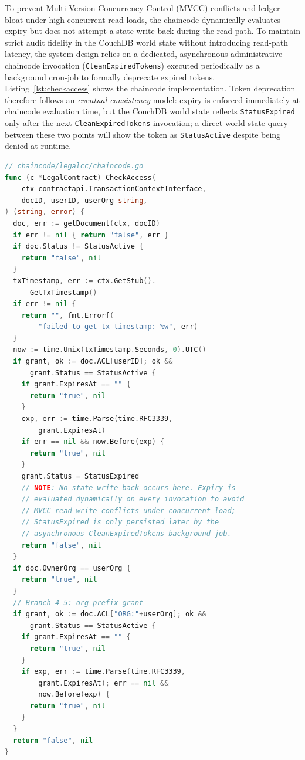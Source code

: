 \documentclass[preprint,12pt]{elsarticle}
\begin{document}
To prevent Multi-Version Concurrency Control (MVCC) conflicts and ledger bloat under high concurrent read loads, the chaincode dynamically evaluates expiry but does not attempt a state write-back during the read path. To maintain strict audit fidelity in the CouchDB world state without introducing read-path latency, the system design relies on a dedicated, asynchronous administrative chaincode invocation (\texttt{CleanExpiredTokens}) executed periodically as a background cron-job to formally deprecate expired tokens.  Listing~\ref{lst:checkaccess} shows the chaincode implementation. Token deprecation therefore follows an \emph{eventual consistency} model: expiry is enforced immediately at chaincode evaluation time, but the CouchDB world state reflects \texttt{StatusExpired} only after the next \texttt{CleanExpiredTokens} invocation; a direct world-state query between these two points will show the token as \texttt{StatusActive} despite being denied at runtime.

\begin{lstlisting}[language=Go,
    caption={\texttt{CheckAccess} chaincode enforcing time-bounded
capability tokens (see Section~\ref{sec:acl} for the eventual-consistency
model). All five access branches shown: per-user grants (Branches~1--2),
owner-organization fallback (Branch~3), and org-prefix grants
(Branches~4--5).},
    label=lst:checkaccess]
// chaincode/legalcc/chaincode.go
func (c *LegalContract) CheckAccess(
    ctx contractapi.TransactionContextInterface,
    docID, userID, userOrg string,
) (string, error) {
  doc, err := getDocument(ctx, docID)
  if err != nil { return "false", err }
  if doc.Status != StatusActive {
    return "false", nil
  }
  txTimestamp, err := ctx.GetStub().
      GetTxTimestamp()
  if err != nil {
    return "", fmt.Errorf(
        "failed to get tx timestamp: %w", err)
  }
  now := time.Unix(txTimestamp.Seconds, 0).UTC()
  if grant, ok := doc.ACL[userID]; ok &&
      grant.Status == StatusActive {
    if grant.ExpiresAt == "" {
      return "true", nil
    }
    exp, err := time.Parse(time.RFC3339,
        grant.ExpiresAt)
    if err == nil && now.Before(exp) {
      return "true", nil
    }
    grant.Status = StatusExpired
    // NOTE: No state write-back occurs here. Expiry is
    // evaluated dynamically on every invocation to avoid
    // MVCC read-write conflicts under concurrent load;
    // StatusExpired is only persisted later by the
    // asynchronous CleanExpiredTokens background job.
    return "false", nil
  }
  if doc.OwnerOrg == userOrg {
    return "true", nil
  }
  // Branch 4-5: org-prefix grant
  if grant, ok := doc.ACL["ORG:"+userOrg]; ok &&
      grant.Status == StatusActive {
    if grant.ExpiresAt == "" {
      return "true", nil
    }
    if exp, err := time.Parse(time.RFC3339,
        grant.ExpiresAt); err == nil &&
        now.Before(exp) {
      return "true", nil
    }
  }
  return "false", nil
}
\end{lstlisting}
\end{document}
